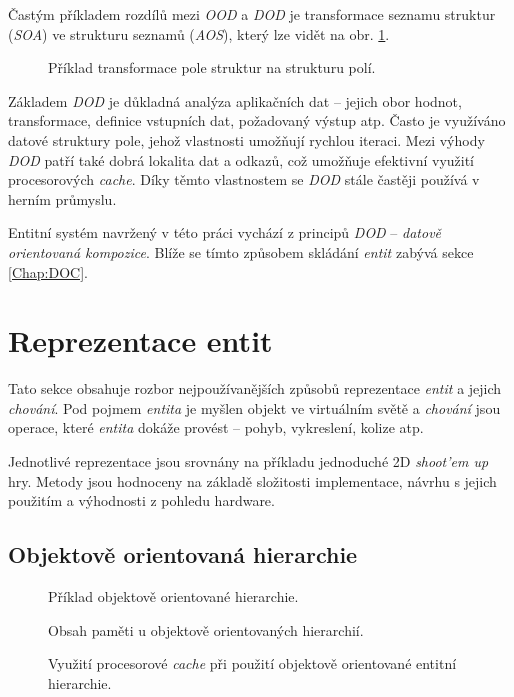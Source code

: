 Častým příkladem rozdílů mezi \emph{OOD} a \emph{DOD} je transformace seznamu struktur (\emph{SOA}) ve strukturu seznamů (\emph{AOS}), který lze vidět na obr. \ref{Fig:SOAASO}.

\begin{figure}[]
	\caption{Příklad transformace pole struktur na strukturu polí.}
	\label{Fig:SOAASO}
\end{figure}

Základem \emph{DOD} je důkladná analýza aplikačních dat -- jejich obor hodnot, transformace, definice vstupních dat, požadovaný výstup atp. Často je využíváno datové struktury pole, jehož vlastnosti umožňují rychlou iteraci. Mezi výhody \emph{DOD} patří také dobrá lokalita dat a odkazů, což umožňuje efektivní využití procesorových \emph{cache}. Díky těmto vlastnostem se \emph{DOD} stále častěji používá v herním průmyslu\cite{DataOrientedDesignDice}\cite{DataOrientedDesignCppCon}.

Entitní systém navržený v této práci vychází z principů \emph{DOD} -- \emph{datově orientovaná kompozice}\cite{DODComponents}. Blíže se tímto způsobem skládání \emph{entit} zabývá sekce \ref{Chap:DOC}.

\section{Reprezentace entit}

Tato sekce obsahuje rozbor nejpoužívanějších způsobů reprezentace \emph{entit}\cite{EvolveHierarchy} a jejich \emph{chování}. Pod pojmem \emph{entita} je myšlen objekt ve virtuálním světě a \emph{chování} jsou operace, které \emph{entita} dokáže provést -- pohyb, vykreslení, kolize atp.

Jednotlivé reprezentace jsou srovnány na příkladu jednoduché 2D \emph{shoot'em up} hry. Metody jsou hodnoceny na základě složitosti implementace, návrhu s jejich použitím a výhodnosti z pohledu hardware.

\subsection{Objektově orientovaná hierarchie}
\begin{figure}[H]
	\caption{Příklad objektově orientované hierarchie.}
\end{figure}
\begin{figure}[H]
	\caption{Obsah paměti u objektově orientovaných hierarchií.}
\end{figure}
\begin{figure}[H]
	\caption{Využití procesorové \emph{cache} při použití objektově orientované entitní hierarchie.}
\end{figure}
\blind[3]

